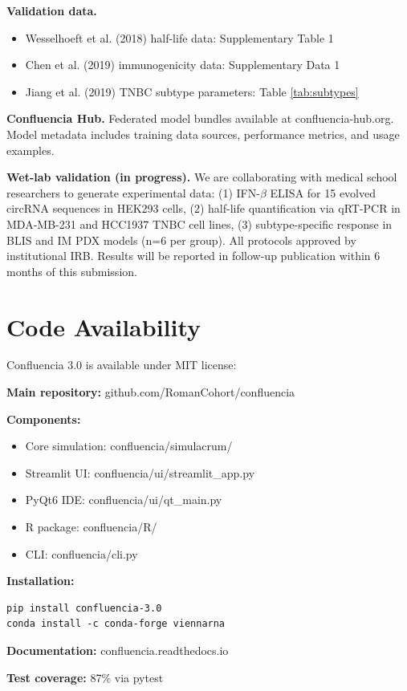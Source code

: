 \documentclass[12pt]{article}
\begin{document}
\textbf{Validation data.}
\begin{itemize}
\item Wesselhoeft et al. (2018) half-life data: Supplementary Table 1
\item Chen et al. (2019) immunogenicity data: Supplementary Data 1
\item Jiang et al. (2019) TNBC subtype parameters: Table \ref{tab:subtypes}
\end{itemize}

\textbf{Confluencia Hub.} Federated model bundles available at confluencia-hub.org. Model metadata includes training data sources, performance metrics, and usage examples.

\textbf{Wet-lab validation (in progress).} We are collaborating with medical school researchers to generate experimental data: (1) IFN-$\beta$ ELISA for 15 evolved circRNA sequences in HEK293 cells, (2) half-life quantification via qRT-PCR in MDA-MB-231 and HCC1937 TNBC cell lines, (3) subtype-specific response in BLIS and IM PDX models (n=6 per group). All protocols approved by institutional IRB. Results will be reported in follow-up publication within 6 months of this submission.

\section{Code Availability}

Confluencia 3.0 is available under MIT license:

\textbf{Main repository:} github.com/RomanCohort/confluencia

\textbf{Components:}
\begin{itemize}
\item Core simulation: confluencia/simulacrum/
\item Streamlit UI: confluencia/ui/streamlit\_app.py
\item PyQt6 IDE: confluencia/ui/qt\_main.py
\item R package: confluencia/R/
\item CLI: confluencia/cli.py
\end{itemize}

\textbf{Installation:}
\begin{verbatim}
pip install confluencia-3.0
conda install -c conda-forge viennarna
\end{verbatim}

\textbf{Documentation:} confluencia.readthedocs.io

\textbf{Test coverage:} 87\% via pytest
\end{document}
